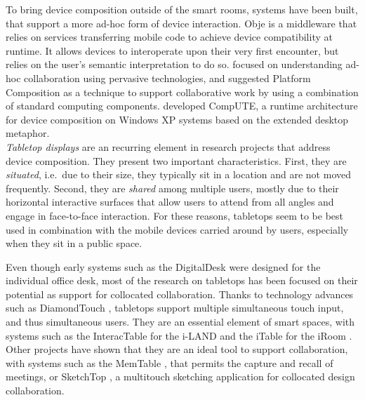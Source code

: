 To bring device composition outside of the smart rooms, systems have been built, that support a more ad-hoc form of device interaction.
Obje \citep{Edwards:2009:obje} is a middleware that relies on services transferring mobile code to achieve device compatibility at runtime.
It allows devices to interoperate upon their very first encounter, but relies on the user's semantic interpretation to do so.
\cite{Pering:2009:platformcomp} focused on understanding ad-hoc collaboration using pervasive technologies, and suggested Platform Composition as a technique to support collaborative work by using a combination of standard computing components.
\cite{Bardram:2010:compute} developed CompUTE, a runtime architecture for device composition  on Windows XP systems based on the extended desktop metaphor.
\\
\linebreak
\emph{Tabletop displays} are an recurring element in research projects that address device composition.
They present two important characteristics.
First, they are \emph{situated}, i.e.\ due to their size, they typically sit in a location and are not moved frequently.
Second, they are \emph{shared} among multiple users, mostly due to their horizontal interactive surfaces that allow users to attend from all angles and engage in face-to-face interaction.
For these reasons, tabletops seem to be best used in combination with the mobile devices carried around by users, especially when they sit in a public space.

Even though early systems such as the DigitalDesk \citep{Wellner:1993:digitaldesk} were designed for the individual office desk, most of the research on tabletops has been focused on their potential as support for collocated collaboration.
Thanks to technology advances such as DiamondTouch \citep{Dietz:2001:diamondtouch},
tabletops support multiple simultaneous touch input, and thus simultaneous users.
They are an essential element of smart spaces, with systems such as the InteracTable for the i-LAND \citep{Streitz:1999:iland} and the iTable for the iRoom \citep{Johanson:2002:iroom}.
Other projects have shown that they are an ideal tool to support collaboration, with systems such as the MemTable \citep{Hunter:2011:memtable}, that permits the capture and recall of meetings, or SketchTop \citep{Clifton:2010:sketchtop}, a multitouch sketching application for collocated design collaboration.

